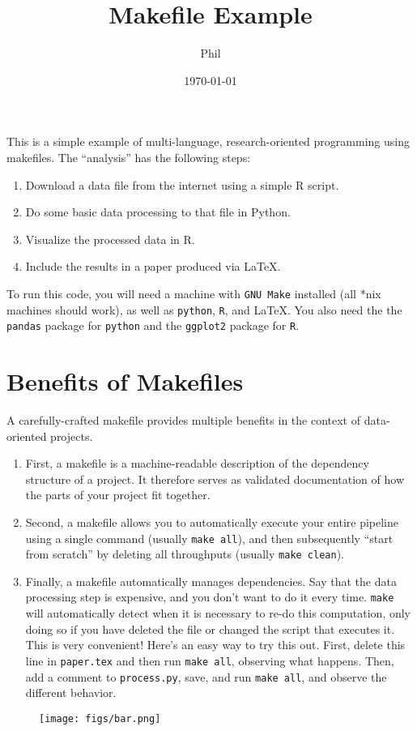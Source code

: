 \documentclass{article}
\title{Makefile Example}
\author{Phil}
\date{\today}
\begin{document}
    \maketitle
    
    This is a simple example of multi-language, research-oriented programming using makefiles. 
    The ``analysis'' has the following steps: 
    \begin{enumerate}
        \item Download a data file from the internet using a simple R script.
        \item Do some basic data processing to that file in Python.
        \item Visualize the processed data in R.
        \item Include the results in a paper produced via LaTeX. 
    \end{enumerate}
    To run this code, you will need a machine with \texttt{GNU Make} installed (all *nix machines should work), as well as \texttt{python}, \texttt{R}, and \LaTeX. 
    You also need the the \texttt{pandas} package for \texttt{python} and the \texttt{ggplot2} package for \texttt{R}. 
    
    \section{Benefits of Makefiles}
        A carefully-crafted makefile provides multiple benefits in the context of data-oriented projects. 
        \begin{enumerate}
            \item First, a makefile is a machine-readable description of the dependency structure of a project. 
            It therefore serves as validated documentation of how the parts of your project fit together. 
            \item Second, a makefile allows you to automatically execute your entire pipeline using a single command (usually \texttt{make all}), and then subsequently ``start from scratch'' by deleting all throughputs (usually \texttt{make clean}). 
            \item Finally, a makefile automatically manages dependencies. Say that the data processing step is expensive, and you don't want to do it every time. 
            \texttt{make} will automatically detect when it is necessary to re-do this computation, only doing so if you have deleted the file or changed the script that executes it. 
            This is very convenient! 
            Here's an easy way to try this out. 
            First, delete this line in \texttt{paper.tex} and then run \texttt{make all}, observing what happens. 
            Then, add a comment to \texttt{process.py}, save, and run \texttt{make all}, and observe the different behavior. 
        \end{enumerate}
    
    \begin{figure}
        \texttt{[image: figs/bar.png]}
    \end{figure}
\end{document}
